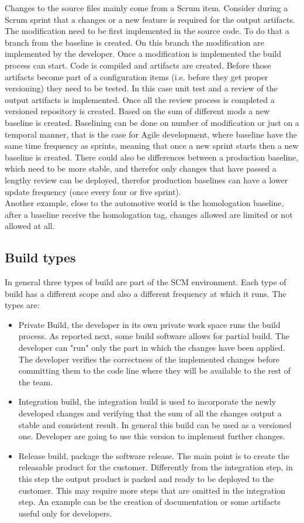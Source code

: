 \documentclass[../main.tex]{subfiles}
\begin{document}
Changes to the source files mainly come from a Scrum item. Consider during a Scrum sprint that a changes or a new feature is required for the output artifacts. The modification need to be first implemented in the source code. To do that a branch from the baseline is created. On this branch the modification are implemented by the developer. Once a modification is implemented the build process can start. Code is compiled and artifacts are created. Before those artifacts become part of a configuration items (i.e. before they get proper versioning) they need to be tested. In this case unit test and a review of the output artifacts is implemented. Once all the review process is completed a versioned repository is created. Based on the sum of different mods a new baseline is created. Baselining can be done on number of modification or just on a temporal manner, that is the case for Agile development, where baseline have the same time frequency as sprints, meaning that once a new sprint starts then a new baseline is created. There could also be differences between a production baseline, which need to be more stable, and therefor only changes that have passed a lengthy review can be deployed, therefor production baselines can have a lower update frequency (once every four or five sprint).\\
Another example, close to the automotive world is the homologation baseline, after a baseline receive the homologation tag, changes allowed are limited or not allowed at all. 
\subsection{Build types}
In general three types of build are part of the \gls{SCM} environment. Each type of build has a different scope and also a different frequency at which it runs. The types are:
\begin{itemize}
    \item Private Build, the developer in its own private work space runs the build process. As reported next, some build software allows for partial build. The developer can "run" only the part in which the changes have been applied. The developer verifies the correctness of the implemented changes before committing them to the code line where they will be available to the rest of the team. 
    \item Integration build, the integration build is used to incorporate the newly developed changes and verifying that the sum of all the changes output a stable and consistent result. In general this build can be used as a versioned one. Developer are going to use this version to implement further changes. 
    \item Release build, package the software release. The main point is to create the releasable product for the customer. Differently from the integration step, in this step the output product is packed and ready to be deployed to the customer. This may require more steps that are omitted in the integration step. An example can be the creation of documentation or some artifacts useful only for developers. 
\end{itemize}
\end{document}
